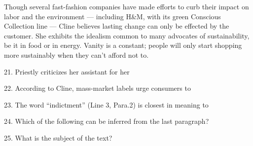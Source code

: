 \qquad Though several fast-fashion companies have made efforts to curb their impact on labor and the environment --- including H\&M, with its green Conscious Collection line --- Cline believes lasting change can only be effected by the customer. She exhibits the idealism common to many advocates of sustainability, be it in food or in energy. Vanity is a constant; people will only start shopping more sustainably when they can't afford not to.

\vspace{6pt}

21. Priestly criticizes her assistant for her\par

22. According to Cline, mass-market labels urge consumers to\par

23. The word ``indictment'' (Line 3, Para.2) is closest in meaning to\par

24. Which of the following can be inferred from the last paragraph?\par

25. What is the subject of the text?\par

